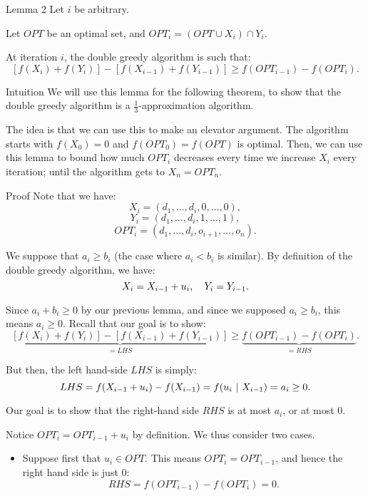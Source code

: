 \documentclass[a4paper]{article}
\begin{document}
\begin{parag}{Lemma 2}
    Let $i$ be arbitrary.

    Let $OPT$ be an optimal set, and $OPT_i = \left(OPT \cup X_i\right) \cap Y_i$.

    At iteration $i$, the double greedy algorithm is such that:
    \[\left[f\left(X_i\right) + f\left(Y_i\right)\right] - \left[f\left(X_{i-1}\right) + f\left(Y_{i-1}\right)\right] \geq f\left(OPT_{i-1}\right) - f\left(OPT_i\right).\]
    
    \begin{subparag}{Intuition}
        We will use this lemma for the following theorem, to show that the double greedy algorithm is a $\frac{1}{3}$-approximation algorithm.

        The idea is that we can use this to make an elevator argument. The algorithm starts with $f\left(X_0\right) = 0$ and $f\left(OPT_0\right) = f\left(OPT\right)$ is optimal. Then, we can use this lemma to bound how much $OPT_{i}$ decreases every time we increase $X_i$ every iteration; until the algorithm gets to $X_n = OPT_{n}$.
    \end{subparag}

    \begin{subparag}{Proof}
        Note that we have:
        \[X_i = \left(d_1, \ldots, d_i, 0, \ldots, 0\right),\] 
        \[Y_i = \left(d_1, \ldots, d_i, 1, \ldots, 1\right),\]
        \[OPT_i = \left(d_1, \ldots, d_{i}, o_{i+1}, \ldots, o_n\right).\]

        We suppose that $a_i \geq b_i$ (the case where $a_i < b_i$ is similar). By definition of the double greedy algorithm, we have: 
        \[X_i = X_{i-1} + u_i, \quad Y_{i} = Y_{i-1}.\]

        Since $a_i + b_i \geq 0$ by our previous lemma, and since we supposed $a_i \geq b_i$, this means $a_i \geq 0$. Recall that our goal is to show:
        \[\underbrace{\left[f\left(X_i\right) + f\left(Y_i\right)\right] - \left[f\left(X_{i-1}\right) + f\left(Y_{i-1}\right)\right]}_{=LHS} \geq \underbrace{f\left(OPT_{i-1}\right) - f\left(OPT_i\right)}_{= RHS}.\]

        But then, the left hand-side $LHS$ is simply:
        \[LHS = f\left(X_{i-1} + u_i\right) - f\left(X_{i-1}\right) = f\left(u_i \suchthat X_{i-1}\right) = a_i \geq 0.\]

        Our goal is to show that the right-hand side $RHS$ is at most $a_i$, or at most $0$.

        Notice $OPT_i = OPT_{i-1} + u_i$ by definition. We thus consider two cases.
        \begin{itemize}[left=0pt]
            \item Suppose first that $u_i \in OPT$. This means $OPT_i = OPT_{i-1}$, and hence the right hand side is just $0$: 
            \[RHS = f\left(OPT_{i-1}\right) - f\left(OPT_i\right) = 0.\]


\end{itemize}
\end{subparag}
\end{parag}
\end{document}
